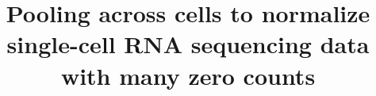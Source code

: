 \documentclass{bmcart}
\begin{document}
\begin{frontmatter}

\begin{fmbox}


\title{Pooling across cells to normalize single-cell RNA sequencing data with many zero counts}


\author[
   addressref={aff1},
   corref={aff1},
   email={aaron.lun@cruk.cam.ac.uk}   
]{ }
\author[
   addressref={aff2},
   email={kbach@ebi.ac.uk}
]{ }
\author[
    addressref={aff1,aff2,aff3},
    email={marioni@ebi.ac.uk}
]{ }


\address[id=aff1]{%
  ,
  ,                     %
  ,                        %
  ,                              %
}
\address[id=aff2]{%
  ,
  ,
  ,
}
\address[id=aff3]{%
  ,
  ,
  ,
  ,
}


\end{fmbox}
\end{frontmatter}
\end{document}
